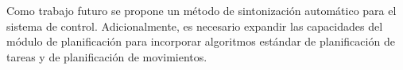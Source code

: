 \documentclass[twocolumn,10pt]{amrob}
\begin{document}
Como trabajo futuro se propone un método de sintonización automático para el sistema de control. Adicionalmente, es necesario expandir las capacidades del módulo de planificación para incorporar algoritmos estándar de planificación de tareas y de planificación de movimientos.









\end{document}

